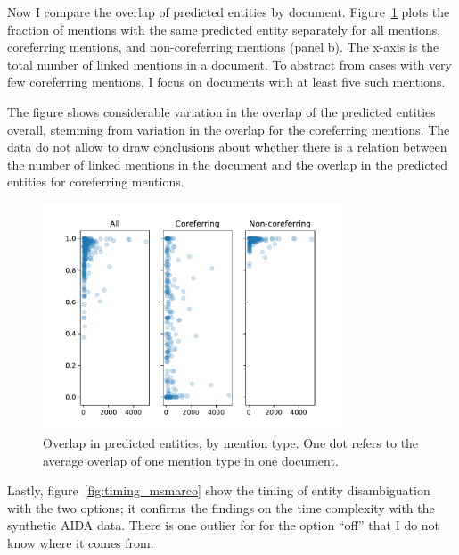 \documentclass[a4paper,11pt]{article}
\numberwithin{equation}{section} %
\begin{document}
Now I compare the overlap of predicted entities by document. Figure~\ref{fig:msmarco_overlap} plots the fraction of mentions with the same predicted entity separately for all mentions, coreferring mentions, and non-coreferring mentions (panel b). The x-axis is the total number of linked mentions in a document.
To abstract from cases with very few coreferring mentions, I focus on documents with at least five such mentions. 

The figure shows considerable variation in the overlap of the predicted entities overall, stemming from variation in the overlap for the coreferring mentions. The data do not allow to draw conclusions about whether there is a relation between the number of linked mentions in the document and the overlap in the predicted entities for coreferring mentions.

\begin{figure}
  \centering
  \includegraphics[width = 0.8\textwidth]{../figs/msmarco_overlap.pdf}
  \caption{Overlap in predicted entities, by mention type. One dot refers to the average overlap of one mention type in one document.}
  \label{fig:msmarco_overlap}
\end{figure}


Lastly, figure~\ref{fig:timing_msmarco} show the timing of entity disambiguation with the two options; it confirms the findings on the time complexity with the synthetic AIDA data. There is one outlier for for the option ``off'' that I do not know where it comes from. 
\end{document}
